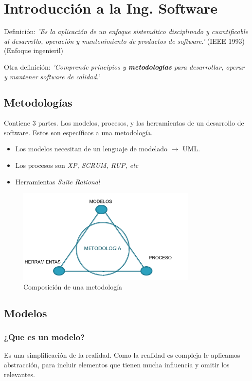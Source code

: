 \documentclass[titlepage,a4paper]{article}
\begin{document}
\section{Introducción a la Ing. Software}
Definición: \textit{'Es la aplicación de un enfoque sistemático disciplinado y cuantificable al desarrollo, operación y mantenimiento de productos de software.'} (IEEE 1993) (Enfoque ingenieril)

\medskip

Otra definición: \textit{'Comprende principios y \textbf{metodologías} para desarrollar, operar y mantener software de calidad.'}


\subsection{Metodologías}
Contiene 3 partes. Los modelos, procesos, y las herramientas de un desarrollo de software. Estos son específicos a una metodología.

\begin{itemize}
    \item Los modelos necesitan de un lenguaje de modelado $\rightarrow$ UML.
    \item Los procesos son \textit{XP, SCRUM, RUP, etc}
    \item Herramientas \textit{Suite Rational}
\end{itemize}

\begin{figure}[!htb]
    \centering
    \includegraphics[width=0.8\textwidth]{Imagenes/Metodologias.png}
    \caption{Composición de una metodología}
\end{figure}

\subsection{Modelos}
\subsubsection*{¿Que es un modelo?}
Es una simplificación de la realidad. Como la realidad es compleja le aplicamos abstracción, para incluir elementos que tienen mucha influencia y omitir los relevantes.
\end{document}
